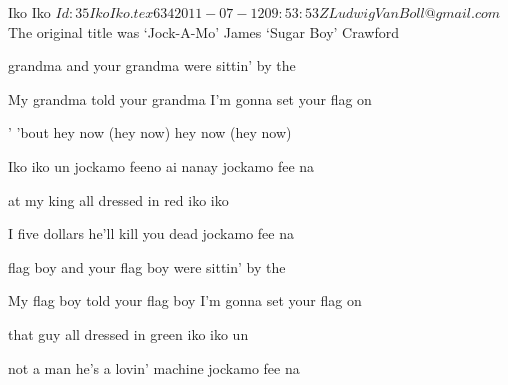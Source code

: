\begin{SBSong}{Iko Iko}
  {$Id: 35IkoIko.tex 634 2011-07-12 09:53:53Z LudwigVanBoll@gmail.com $}
  {The original title was `Jock-A-Mo'}
  {James `Sugar Boy' Crawford}
  \begin{SBVerse}
     grandma and your grandma were sittin' by the  
    
    My grandma told your grandma I'm gonna set your flag on 
  \end{SBVerse}
  \begin{SBChorus}
    ' 'bout hey now (hey now) hey now (hey now)
    
    Iko iko un jockamo feeno ai nanay jockamo fee na 
  \end{SBChorus}
  \begin{SBVerse}
     at my king all dressed in red iko iko 
    
    I  five dollars he'll kill you dead jockamo fee na 
  \end{SBVerse}
  \begin{SBVerse}
     flag boy and your flag boy were sittin' by the  
    
    My flag boy told your flag boy I'm gonna set your flag on  
  \end{SBVerse}
  \begin{SBVerse}
     that guy all dressed in green iko iko un 
    
     not a man he's a lovin' machine jockamo fee na 
  \end{SBVerse}
\end{SBSong}